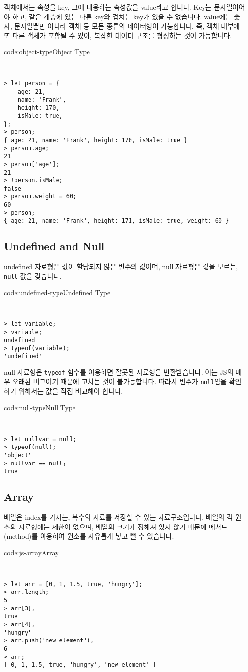 객체에서는 속성을 key, 그에 대응하는 속성값을 value라고 합니다. Key는 문자열이어야 하고, 같은 계층에 있는 다른 key와 겹치는 key가 있을 수 없습니다. value에는 숫자, 문자열뿐만 아니라 객체 등 모든 종류의 데이터형이 가능합니다. 즉, 객체 내부에 또 다른 객체가 포함될 수 있어, 복잡한 데이터 구조를 형성하는 것이 가능합니다. 

\begin{codeenv}{code:object-type}{Object Type}\begin{verbatim}


> let person = {
    age: 21,
    name: 'Frank',
    height: 170,
    isMale: true,
};
> person;
{ age: 21, name: 'Frank', height: 170, isMale: true }
> person.age;
21
> person['age'];
21
> !person.isMale;
false
> person.weight = 60;
60
> person;
{ age: 21, name: 'Frank', height: 171, isMale: true, weight: 60 }
\end{verbatim}
\end{codeenv}

\subsection*{Undefined and Null}

undefined 자료형은 값이 할당되지 않은 변수의 값이며, null 자료형은 값을 모르는, \texttt{null} 값을 갖습니다. 

\begin{codeenv}{code:undefined-type}{Undefined Type}\begin{verbatim}


> let variable;
> variable;
undefined
> typeof(variable);
'undefined'
\end{verbatim}
\end{codeenv}

null 자료형은 \texttt{typeof} 함수를 이용하면 잘못된 자료형을 반환받습니다. 이는 JS의 매우 오래된 버그이기 때문에 고치는 것이 불가능합니다. 따라서 변수가 \texttt{null}임을 확인하기 위해서는 값을 직접 비교해야 합니다. 

\begin{codeenv}{code:null-type}{Null Type}\begin{verbatim}


> let nullvar = null;
> typeof(null);
'object'
> nullvar == null;
true
\end{verbatim}
\end{codeenv}

\subsection*{Array}

배열은 index를 가지는, 복수의 자료를 저장할 수 있는 자료구조입니다. 배열의 각 원소의 자료형에는 제한이 없으며, 배열의 크기가 정해져 있지 않기 때문에 메서드(method)를 이용하여 원소를 자유롭게 넣고 뺄 수 있습니다. 

\begin{codeenv}{code:js-array}{Array}\begin{verbatim}


> let arr = [0, 1, 1.5, true, 'hungry'];
> arr.length;
5
> arr[3];
true
> arr[4];
'hungry'
> arr.push('new element');
6
> arr;
[ 0, 1, 1.5, true, 'hungry', 'new element' ]
\end{verbatim}
\end{codeenv}
